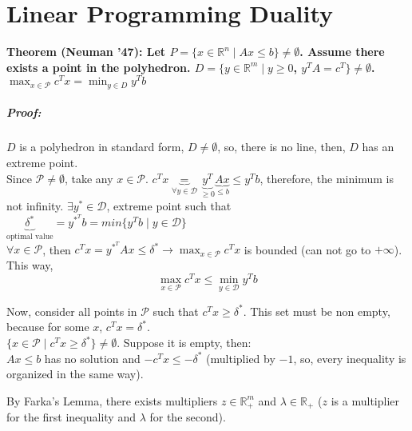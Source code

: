 \documentclass[main]{subfiles}
\begin{document}

\section{Linear Programming Duality}

\textbf{Theorem (Neuman '47): Let $P = \{x \in \mathbb{R}^n \mid Ax \leq b \}
\neq \emptyset$. Assume there exists a point in the polyhedron. $D = \{ y \in
\mathbb{R}^m \mid y \geq 0$, $y^TA = c^T\} \neq \emptyset$.
\emph{$\displaystyle \max_{x \in \mathcal{P}} c^{T}x = \min_{y \in D} y^T b$ }}

\subparagraph{Proof:}
$D$ is a polyhedron in standard form, $D \neq \emptyset$, so, there is no
line, then, $D$ has an extreme point. \\
Since $\mathcal{P} \neq \emptyset$, take any $x \in \mathcal{P}$.
$c^T x \underbrace{=}_{\forall y \in \mathcal{D}} \underbrace{y^T}_{\geq 0}
\underbrace{Ax}_{\leq b} \leq y^T b$, therefore, the minimum is not infinity.
$\exists y^* \in \mathcal{D}$, extreme point such that
$\underbrace{\delta^*}_{\text{optimal value}} = y^{*^T} b = min\{y^T b \mid y
\in \mathcal{D}\}$\\
$\forall x \in \mathcal{P}$, then $c^T x = y^{*^T}Ax \leq \delta^* \rightarrow
\displaystyle \max_{x \in \mathcal{P}} c^{T}x$ is bounded (can not go to
$+\infty$).\\

This way, 
\begin{equation}
\displaystyle \max_{x \in \mathcal{P}} c^{T}x \leq \displaystyle \min_{y \in 
\mathcal{D}} y^{T}b
\end{equation}

Now, consider all points in $\mathcal{P}$ such that $c^T x \geq \delta^*$.
This set must be non empty, because for some $x$, $c^T x = \delta^*$.\\
$\{x \in\mathcal{P} \mid c^T x \geq \delta^* \} \neq \emptyset$. Suppose
it is empty, then:\\
$Ax \leq b$ has no solution and $-c^T x \leq -\delta^*$ (multiplied by $-1$,
so, every inequality is organized in the same way).

By Farka's Lemma, there exists multipliers $z \in \mathbb{R}_{+}^{m}$ and
$\lambda \in \mathbb{R}_{+}$ ($z$ is a multiplier for the first inequality and 
$\lambda$ for the second).
\end{document}

